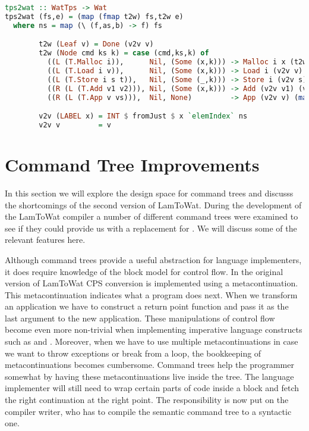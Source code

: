 \begin{lstlisting}[language=Haskell]
tps2wat :: WatTps -> Wat
tps2wat (fs,e) = (map (fmap t2w) fs,t2w e)
  where ns = map (\ (f,as,b) -> f) fs

        t2w (Leaf v) = Done (v2v v)
        t2w (Node cmd ks k) = case (cmd,ks,k) of
          ((L (T.Malloc i)),      Nil, (Some (x,k))) -> Malloc i x (t2w k)
          ((L (T.Load i v)),      Nil, (Some (x,k))) -> Load i (v2v v) x (t2w k)
          ((L (T.Store i s t)),   Nil, (Some (_,k))) -> Store i (v2v s) (v2v t) (t2w k)
          ((R (L (T.Add v1 v2))), Nil, (Some (x,k))) -> Add (v2v v1) (v2v v2) x (t2w k)
          ((R (L (T.App v vs))),  Nil, None)         -> App (v2v v) (map v2v vs)

        v2v (LABEL x) = INT $ fromJust $ x `elemIndex` ns
        v2v v         = v
\end{lstlisting}

\section{\label{section:ctreebetter}Command Tree Improvements}
In this section we will explore the design space for command trees and discusss the shortcomings of the second version of LamToWat. During the development of the LamToWat compiler a number of different command trees were examined to see if they could provide us with a replacement for . We will discuss some of the relevant features here.

Although command trees provide a useful abstraction for language implementers, it does require knowledge of the block model for control flow. In the original version of LamToWat CPS conversion is implemented using a metacontinuation. This metacontinuation indicates what a program does next. When we transform an application we have to construct a return point function and pass it as the last argument to the new application. These manipulations of control flow become even more non-trivial when implementing imperative language constructs such as  and . Moreover, when we have to use multiple metacontinuations in case we want to throw exceptions or break from a  loop, the bookkeeping of metacontinuations becomes cumbersome. Command trees help the programmer somewhat by having these metacontinuations live inside the tree. The language implementer will still need to wrap certain parts of code inside a block and fetch the right continuation at the right point. The responsibility is now put on the compiler writer, who has to compile the semantic command tree to a syntactic one.


